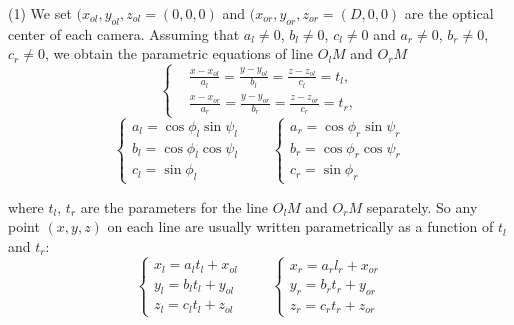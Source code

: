 (1) We set $(x_{ol}, y_{ol}, z_{ol}=(0, 0, 0)$ and $(x_{or}, y_{or}, z_{or}=(D, 0, 0)$ are the optical center of each camera. Assuming that $a_l\neq0$, $b_l\neq0$, $c_l\neq0$ and $a_r\neq0$, $b_r\neq0$, $c_r\neq0$, we obtain the parametric equations of line $O_lM$ and $O_rM$ 
\begin{equation}  
\left \{
	\begin{split}
		&\frac{x-x_{ol}}{a_l} = \frac{y-y_{ol}}{b_l} = \frac{z-z_{ol}}{c_l} = t_l,\\
		&\frac{x-x_{or}}{a_r} = \frac{y-y_{or}}{b_r} = \frac{z-z_{or}}{c_r} = t_r,
	\end{split}
\right.
\end{equation}
\begin{equation}  
\left\{ 
\begin{array}{lll} 
a_l = \cos \phi_l \sin \psi_l\\
b_l = \cos \phi_l \cos \psi_l\\
c_l = \sin \phi_l
\end{array} 
\right.
\qquad
\left\{ 
\begin{array}{lll} 
a_r = \cos \phi_r \sin \psi_r\\
b_r = \cos \phi_r \cos \psi_r\\
c_r = \sin \phi_r
\end{array} 
\right.
\end{equation}

where $t_l$, $t_r$ are the parameters for the line $O_lM$ and $O_rM$ separately.
So any point $(x, y, z)$ on each line are usually written parametrically as a function of $t_l$ and $t_r$:
\begin{equation}  
	\left\{ 
	\begin{array}{lll} 
		x_l = a_l t_l + x_{ol} \\
		y_l = b_l t_l + y_{ol} \\
		z_l = c_l t_l + z_{ol}
	\end{array} 
	\right.
	\qquad
		\left\{ 
	\begin{array}{lll} 
	x_r = a_r l_r + x_{or} \\
	y_r = b_r t_r + y_{or} \\
	z_r = c_r t_r + z_{or}
	\end{array} 
	\right.
\end{equation}

